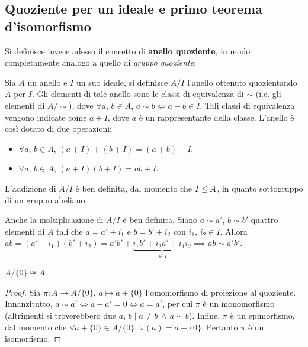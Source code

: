 \subsection{Quoziente per un ideale e primo teorema d'isomorfismo}

Si definisce invece adesso il concetto di \textbf{anello quoziente}, in modo
completamente analogo a quello di \textit{gruppo quoziente}:

\begin{definition}
    Sia $A$ un anello e $I$ un suo ideale, si definisce $A/I$ l'anello ottenuto
    quozientando $A$ per $I$. Gli elementi di tale anello sono le classi di equivalenza di $\sim$ (i.e. gli elementi di $A/{\sim}$), dove $\forall a$, $b \in A$, $a\sim b \iff a-b \in I$. Tali classi di equivalenza vengono indicate come
    $a + I$, dove $a$ è un rappresentante della classe. L'anello è così dotato di due operazioni:

    \begin{itemize}
        \item $\forall a$, $b \in A$, $(a+I)+(b+I)=(a+b)+I$,
        \item $\forall a$, $b \in A$, $(a+I)(b+I)=ab+I$.
    \end{itemize}
\end{definition}

\begin{remark*}
    L'addizione di $A/I$ è ben definita, dal momento che $I \mathrel{\unlhd} A$, in quanto sottogruppo di un gruppo abeliano.
\end{remark*}

\begin{remark*}
    Anche la moltiplicazione di $A/I$ è ben definita. Siano $a\sim a'$, $b \sim b'$ quattro elementi di $A$ tali che $a = a' + i_1$ e $b = b' + i_2$ con $i_1$, $i_2 \in I$. Allora $ab=(a'+i_1)(b'+i_2)=a'b' + \underbrace{i_1b' + i_2a' + i_1i_2}_{\in I} \implies ab \sim a'b'$.
\end{remark*}

\begin{proposition}
    \label{prop:quoziente_pieno}
    $A/\{0\} \cong A$.
\end{proposition}

\begin{proof}
    Sia $\pi : A \to A/\{0\}$, $a \mapsto a + \{0\}$ l'omomorfismo di proiezione
    al quoziente. Innanzitutto, $a \sim a' \iff a-a'=0 \iff a=a'$, per cui $\pi$ è
    un monomorfismo (altrimenti si troverebbero due $a$, $b \mid a \neq b \,\land\, a \sim b$). Infine, $\pi$ è un epimorfismo, dal momento che $\forall a + \{0\} \in A/\{0\}, \, \pi(a) = a + \{0\}$. Pertanto $\pi$ è un isomorfismo.
\end{proof}

